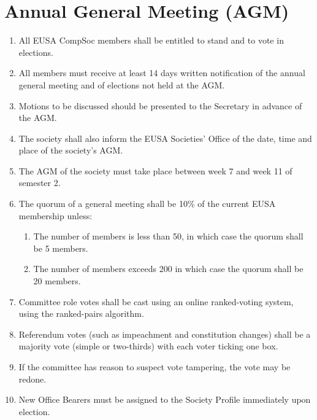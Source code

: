 \section{Annual General Meeting (AGM)}

\begin{enumerate}

\item All EUSA CompSoc members shall be entitled to stand and to vote in elections.

\item All members must receive at least 14 days written notification of the annual general meeting and of elections not held at the AGM\@.

\item Motions to be discussed should be presented to the Secretary in advance of the AGM\@.

\item The society shall also inform the EUSA Societies' Office of the date, time and place of the society's AGM\@.

\item The AGM of the society must take place between week 7 and week 11 of semester 2.

\item The quorum of a general meeting shall be 10\% of the current EUSA membership unless:
  \begin{enumerate}
  \item The number of members is less than 50, in which case the quorum shall be 5 members.
  \item The number of members exceeds 200 in which case the quorum shall be 20 members.
  \end{enumerate}

\item Committee role votes shall be cast using an online ranked-voting system, using the ranked-pairs algorithm.

\item Referendum votes (such as impeachment and constitution changes) shall be a majority vote (simple or two-thirds) with each voter ticking one box.

\item If the committee has reason to suspect vote tampering, the vote may be redone.

\item New Office Bearers must be assigned to the Society Profile immediately upon election.


\end{enumerate}
